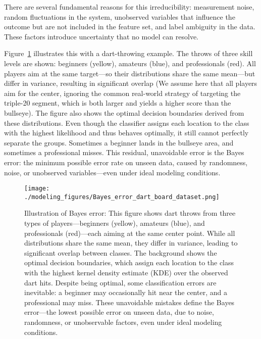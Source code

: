 \documentclass[12pt,openany]{book}
\begin{document}
There are several fundamental reasons for this irreducibility: measurement noise, random fluctuations in the system, unobserved variables that influence the outcome but are not included in the feature set, and label ambiguity in the data. These factors introduce uncertainty that no model can resolve. \newline

Figure~\ref{fig:bayes-error-darts} illustrates this with a dart-throwing example. The throws of three skill levels are shown: beginners (yellow), amateurs (blue), and professionals (red). All players aim at the same target—so their distributions share the same mean—but differ in variance, resulting in significant overlap (We assume here that all players aim for the center, ignoring the common real-world strategy of targeting the triple-20 segment, which is both larger and yields a higher score than the bullseye). The figure also shows the optimal decision boundaries derived from these distributions. Even though the classifier assigns each location to the class with the highest likelihood and thus behaves optimally, it still cannot perfectly separate the groups. Sometimes a beginner lands in the bullseye area, and sometimes a professional misses. This residual, unavoidable error is the Bayes error: the minimum possible error rate on unseen data, caused by randomness, noise, or unobserved variables—even under ideal modeling conditions.

\begin{figure}[H]
    \centering
    \texttt{[image: ./modeling\_figures/Bayes\_error\_dart\_board\_dataset.png]}
    \caption{
    Illustration of Bayes error: This figure shows dart throws from three types of players—beginners (yellow), amateurs (blue), and professionals (red)—each aiming at the same center point. While all distributions share the same mean, they differ in variance, leading to significant overlap between classes. The background shows the optimal decision boundaries, which assign each location to the class with the highest kernel density estimate (KDE) over the observed dart hits. Despite being optimal, some classification errors are inevitable: a beginner may occasionally hit near the center, and a professional may miss. These unavoidable mistakes define the Bayes error—the lowest possible error on unseen data, due to noise, randomness, or unobservable factors, even under ideal modeling conditions.
    }
    \label{fig:bayes-error-darts}
\end{figure}
\end{document}
